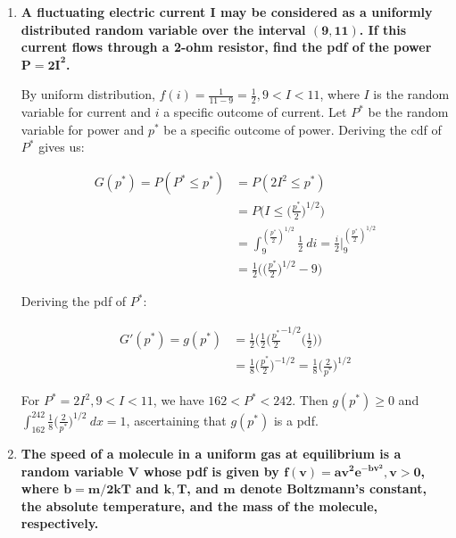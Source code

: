 \documentclass[10pt, oneside]{article}
\begin{document}
\begin{enumerate}[label=5.\arabic*]
For $A(r) = 4 \pi r^2$ over $0 < r < 1$, we have $0 < A(r) < 4 \pi$. Then $g(a) \geq 0$ over this interval, and $\int^{4\pi}_0 \frac{3}{4 \pi} \Big( 1 - \Big( \frac{1}{4 \pi} a \Big)^{1/2} \Big) \ da = \boxed{1}$, ascertaining that $g(a)$ is a pdf.

\item  \begin{tcolorbox}[
  colback=Cerulean!5!white,
  colframe=Cerulean!75!black]
\textbf{A fluctuating electric current $\bm{I}$ may be considered as a uniformly distributed random variable over the interval $\bm{(9, 11)}$. If this current flows through a 2-ohm resistor, find the pdf of the power $\bm{P = 2 I^2}$.}
\end{tcolorbox}

By uniform distribution, $f(i) = \frac{1}{11 - 9} = \frac{1}{2}, 9 < I < 11$, where $I$ is the random variable for current and $i$ a specific outcome of current. Let $P^*$ be the random variable for power and $p^*$ be a specific outcome of power. Deriving the cdf of $P^*$ gives us:

\begin{align*}
G(p^*) = P(P^* \leq p^*) &= P(2 I^2 \leq p^*) \\
&= P \Big(I \leq \Big( \frac{p^*}{2} \Big)^{1/2} \Big) \\
&= \int^{( \frac{p^*}{2} )^{1/2}}_9 \frac{1}{2} \ di = \frac{i}{2} \Big|^{(\frac{p^*}{2} )^{1/2}}_9 \\
&= \frac{1}{2} \Big( \Big( \frac{p^*}{2} \Big)^{1/2} - 9 \Big)
\end{align*}

Deriving the pdf of $P^*$:

\begin{align*}
G'(p^*) = g(p^*) &= \frac{1}{2} \Big( \frac{1}{2} \Big( \frac{p^*}{2}^{-1/2} \Big( \frac{1}{2} \Big) \Big) \\
&= \frac{1}{8} \Big( \frac{p^*}{2} \Big)^{-1/2} = \boxed{\frac{1}{8} \Big( \frac{2}{p^*} \Big)^{1/2}}
\end{align*}

For $P^* = 2I^2, 9 < I < 11$, we have $162 < P^* < 242$. Then $g(p^*) \geq 0$ and $\int^{242}_{162} \frac{1}{8} \Big( \frac{2}{p^*} \Big)^{1/2} \ dx = \boxed{1}$, ascertaining that $g(p^*)$ is a pdf.

\item  \begin{tcolorbox}[
  colback=Cerulean!5!white,
  colframe=Cerulean!75!black]
\textbf{The speed of a molecule in a uniform gas at equilibrium is a random variable $\bm{V}$ whose pdf is given by $\bm{f(v) = av^2 e^{-bv^2}, v > 0}$, where $\bm{b = m / 2kT}$ and $\bm{k, T}$, and $\bm{m}$ denote Boltzmann's constant, the absolute temperature, and the mass of the molecule, respectively.}
\end{tcolorbox}
	

\end{enumerate}
\end{document}
